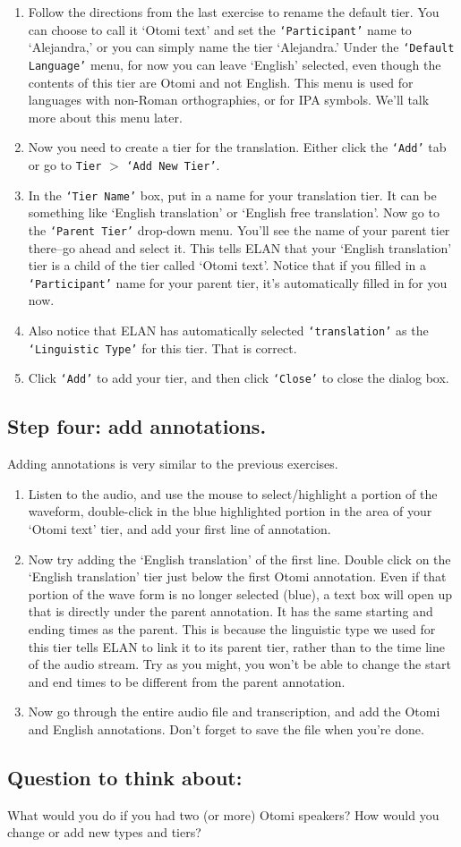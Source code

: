 \documentclass[letterpaper,12pt]{article}
\begin{document}
\begin{enumerate}
\item Follow the directions from the last exercise to rename the default tier. You can choose to call it `Otomi text' and set the \texttt{`Participant'} name to `Alejandra,' or you can simply name the tier `Alejandra.' Under the \texttt{`Default Language'} menu, for now you can leave `English' selected, even though the contents of this tier are Otomi and not English. This menu is used for languages with non-Roman orthographies, or for IPA symbols. We'll talk more about this menu later.
\item Now you need to create a tier for the translation. Either click the \texttt{`Add'} tab or go to \texttt{Tier} $>$ \texttt{`Add New Tier'}.
\item In the \texttt{`Tier Name'} box, put in a name for your translation tier. It can be something like `English translation' or `English free translation'. Now go to the \texttt{`Parent Tier'} drop-down menu. You'll see the name of your parent tier there--go ahead and select it. This tells ELAN that your `English translation' tier is a child of the tier called `Otomi text'. Notice that if you filled in a \texttt{`Participant'} name for your parent tier, it's automatically filled in for you now.
\item Also notice that ELAN has automatically selected \texttt{`translation'} as the \texttt{`Linguistic Type'} for this tier. That is correct.
\item Click \texttt{`Add'} to add your tier, and then click \texttt{`Close'} to close the dialog box.
\end{enumerate}

\subsection*{Step four: add annotations.}
\noindent Adding annotations is very similar to the previous exercises.

\begin{enumerate}
\item Listen to the audio, and use the mouse to select/highlight a portion of the waveform, double-click in the blue highlighted portion in the area of your `Otomi text' tier, and add your first line of annotation.
\item Now try adding the `English translation' of the first line. Double click on the `English translation' tier just below the first Otomi annotation. Even if that portion of the wave form is no longer selected (blue), a text box will open up that is directly under the parent annotation. It has the same starting and ending times as the parent. This is because the linguistic type we used for this tier tells ELAN to link it to its parent tier, rather than to the time line of the audio stream. Try as you might, you won't be able to change the start and end times to be different from the parent annotation.
\item Now go through the entire audio file and transcription, and add the Otomi and English annotations. Don't forget to save the file when you're done.
\end{enumerate}

\subsection*{Question to think about:}
What would you do if you had two (or more) Otomi speakers? How would you change or add new types and tiers?
\end{document}
